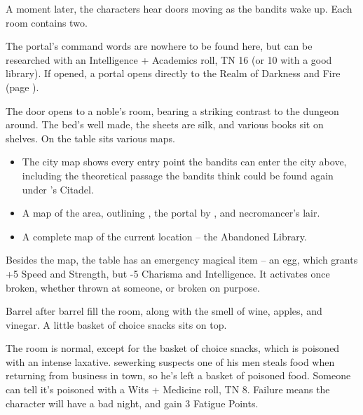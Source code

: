 A moment later, the characters hear doors moving as the bandits wake up.  Each room contains two.

The portal's command words are nowhere to be found here, but can be researched with an Intelligence + Academics roll, TN 16 (or 10 with a good library).  If opened, a portal opens directly to the Realm of Darkness and Fire (page \pageref{darknessandfire}).




\begin{boxtext}
	The door opens to a noble's room, bearing a striking contrast to the dungeon around.  The bed's well made, the sheets are silk, and various books sit on shelves.  On the table sits various maps.
\end{boxtext}

\begin{itemize}

	\item{The city map shows every entry point the bandits can enter the city above, including the theoretical passage the bandits think could be found again under 's Citadel.}
	\item{A map of the area, outlining , the portal by , and \gls{necromancer}'s lair.}
	\item{A complete map of the current location -- the Abandoned Library.}
\end{itemize}

Besides the map, the table has an emergency magical item -- an egg, which grants +5 Speed and Strength, but -5 Charisma and Intelligence.  It activates once broken, whether thrown at someone, or broken on purpose.



\begin{boxtext}
	Barrel after barrel fill the room, along with the smell of wine, apples, and vinegar.  A little basket of choice snacks sits on top.
\end{boxtext}

The room is normal, except for the basket of choice snacks, which is poisoned with an intense laxative.  \Gls{sewerking} suspects one of his men steals food when returning from business in town, so he's left a basket of poisoned food.  Someone can tell it's poisoned with a Wits + Medicine roll, TN 8.  Failure means the character will have a bad night, and gain 3 Fatigue Points.

